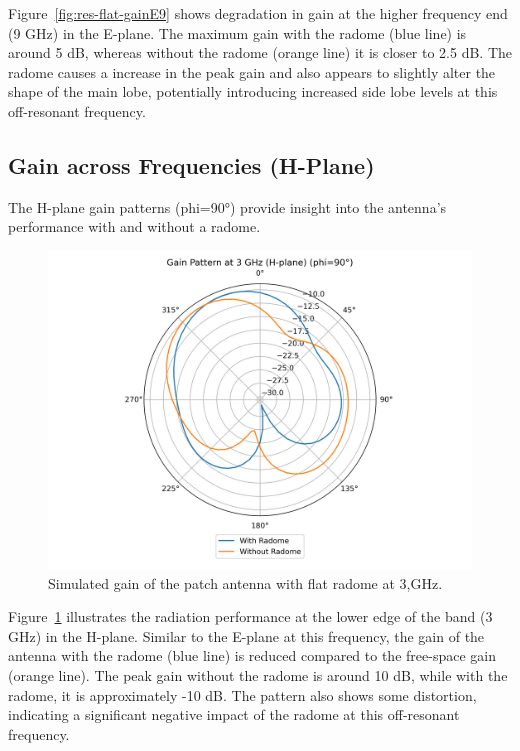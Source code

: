 Figure~\ref{fig:res-flat-gainE9} shows degradation in gain at the higher frequency end (9 GHz) in the E-plane. The maximum gain with the radome (blue line) is around 5 dB, whereas without the radome (orange line) it is closer to 2.5 dB. The radome causes a increase in the peak gain and also appears to slightly alter the shape of the main lobe, potentially introducing increased side lobe levels at this off-resonant frequency.

\subsection{Gain across Frequencies (H-Plane)}

The H-plane gain patterns (phi=90°) provide insight into the antenna's performance with and without a radome.

\begin{figure}[H]
\centering
\includegraphics[width=1.0\textwidth]{figures/comparison_flat_radome/gainH_3_GHz.png}
\caption{Simulated gain of the patch antenna with flat radome at 3,GHz.}
\label{fig:res-flat-gainH3}
\end{figure}

Figure~\ref{fig:res-flat-gainH3} illustrates the radiation performance at the lower edge of the band (3 GHz) in the H-plane. Similar to the E-plane at this frequency, the gain of the antenna with the radome (blue line) is reduced compared to the free-space gain (orange line). The peak gain without the radome is around 10 dB, while with the radome, it is approximately -10 dB. The pattern also shows some distortion, indicating a significant negative impact of the radome at this off-resonant frequency.

